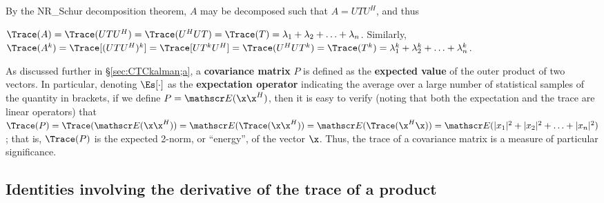 \noindent By the NR_Schur decomposition theorem, $A$ may be decomposed
such that $A=UTU^{H}$, and thus

\begin{fact} \label{fact.A.F.A.b}
$\Trace(A)=\Trace(UTU^{H})=\Trace(U^{H}UT)=\Trace(T)=\lambda_{1}+\lambda_{2}+\ldots+\lambda_{n}$.  \hfill\break
Similarly,
$\Trace(A^k)=\Trace[(UTU^{H})^k]=\Trace[UT^kU^{H}]=\Trace(U^{H}UT^k)=\Trace(T^k)=\lambda_{1}^k+\lambda_{2}^k+\ldots+\lambda_{n}^k$.
\end{fact}

As discussed further in \S \ref{sec:CTCkalman;a}, a {\bf covariance matrix} $P$ is
defined as the {\bf expected value} of the outer product of two vectors. 
In particular, denoting $\Es[\cdot]$ as the {\bf expectation operator} indicating the average over a
large number of statistical samples of the quantity in brackets, if we define
$P={\mathscr E}(\x \x^{H})$, then it is easy to verify (noting that both the expectation and the trace are linear operators) that
$\Trace(P)=\Trace({\mathscr E}(\x \x^{H}))={\mathscr E}(\Trace(\x \x^{H}))={\mathscr E}(\Trace(\x^{H}\x))={\mathscr E}(|x_{1}|^{2}+|x_{2}|^{2}+\ldots+|x_{n}|^{2})$; 
that is, $\Trace(P)$ is the expected 2-norm, or ``energy'', of the vector $\x$.  Thus, the trace of a covariance matrix is a measure of particular significance.

\subsection{Identities involving the derivative of the trace of a product}

